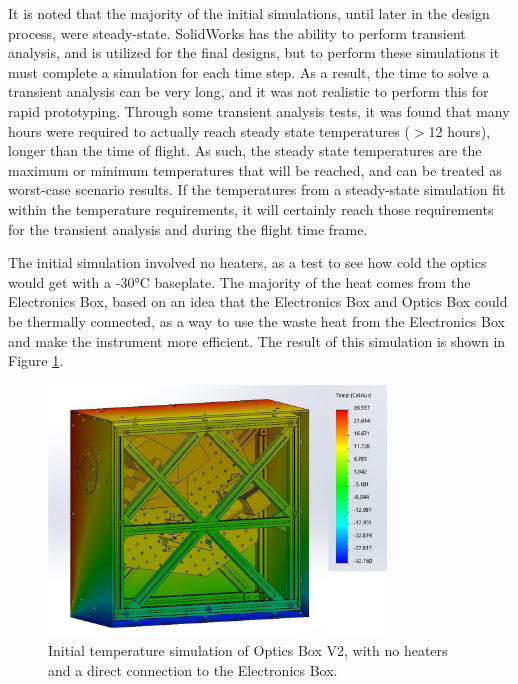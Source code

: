 It is noted that the majority of the initial simulations, until later in the design process, were steady-state. SolidWorks has the ability to perform transient analysis, and is utilized for the final designs, but to perform these simulations it must complete a simulation for each time step. As a result, the time to solve a transient analysis can be very long, and it was not realistic to perform this for rapid prototyping. Through some transient analysis tests, it was found that many hours were required to actually reach steady state temperatures ($>$12 hours), longer than the time of flight. As such, the steady state temperatures are the maximum or minimum temperatures that will be reached, and can be treated as worst-case scenario results. If the temperatures from a steady-state simulation fit within the temperature requirements, it will certainly reach those requirements for the transient analysis and during the flight time frame.

The initial simulation involved no heaters, as a test to see how cold the optics would get with a -30°C baseplate. The majority of the heat comes from the Electronics Box, based on an idea that the Electronics Box and Optics Box could be thermally connected, as a way to use the waste heat from the Electronics Box and make the instrument more efficient. The result of this simulation is shown in Figure \ref{fig:OB_V2_TA_1}. 

\begin{figure}
    \centering
    \includegraphics[width=0.8\textwidth]{chap3_images/LIFE_V2_images/Thermal_Analysis_25_deg_-30_deg_FIXED.png}
    \caption{Initial temperature simulation of Optics Box V2, with no heaters and a direct connection to the Electronics Box.}
    \label{fig:OB_V2_TA_1}
\end{figure}

